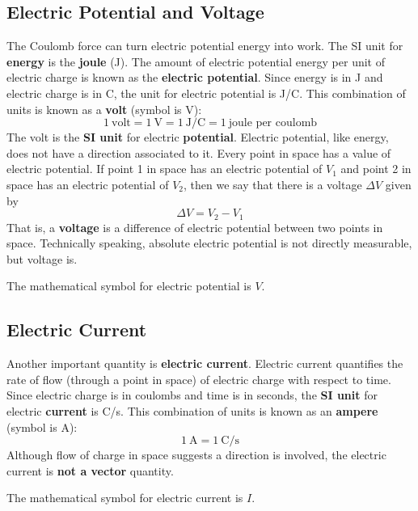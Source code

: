 \subsection{Electric Potential and Voltage}
%
The Coulomb force can turn electric potential energy into work. The SI unit for \textbf{energy} is the \textbf{joule} (J). The amount of electric potential energy per unit of electric charge is known as the \textbf{electric potential}. Since energy is in J and electric charge is in C, the unit for electric potential is J/C. This combination of units is known as a \textbf{volt} (symbol is V):
\begin{equation}
	1 \ \text{volt} = 1 \ \text{V} = 1 \ \text{J/C} = 1 \ \text{joule per coulomb}
\end{equation}
The volt is the \textbf{SI unit} for electric \textbf{potential}. Electric potential, like energy, does not have a direction associated to it. Every point in space has a value of electric potential. If point 1 in space has an electric potential of $V_{1}$ and point 2 in space has an electric potential of $V_{2}$, then we say that there is a voltage $\Delta V$ given by
\begin{equation}
	\Delta V = V_{2} - V_{1}
\end{equation}
That is, a \textbf{voltage} is a difference of electric potential between two points in space. Technically speaking, absolute electric potential is not directly measurable, but voltage is.

The mathematical symbol for electric potential is $V$.
%
\subsection{Electric Current}
%
Another important quantity is \textbf{electric current}. Electric current quantifies the rate of flow (through a point in space) of electric charge with respect to time. Since electric charge is in coulombs and time is in seconds, the \textbf{SI unit} for electric \textbf{current} is C/s. This combination of units is known as an \textbf{ampere} (symbol is A):
\begin{equation}
	1 \ \text{A} = 1 \ \text{C/s}
\end{equation}
Although flow of charge in space suggests a direction is involved, the electric current is \textbf{not a vector} quantity.

The mathematical symbol for electric current is $I$.
%
